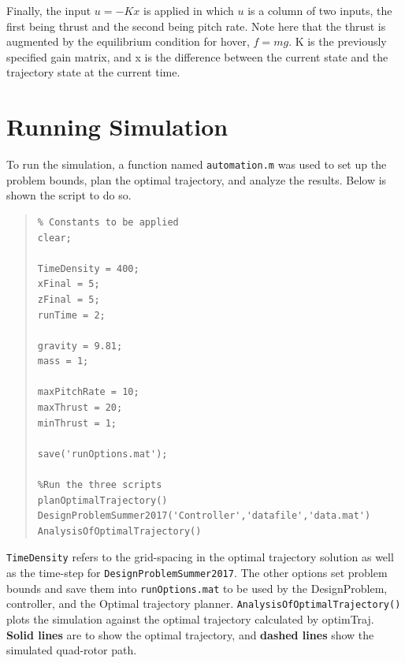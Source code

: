 \documentclass[12pt]{article}
\begin{document}
Finally, the input $u = -Kx$ is applied in which $u$ is a column of two inputs, the first being thrust and the second being pitch rate.  Note here that the thrust is augmented by the equilibrium condition for hover, $f = mg$.  K is the previously specified gain matrix, and x is the difference between the current state and the trajectory state at the current time.

\section{Running Simulation}\label{Running Simulation}

To run the simulation, a function named \lstinline!automation.m! was used to set up the problem bounds, plan the optimal trajectory, and analyze the results. Below is shown the script to do so.
\begin{quote}
\begin{lstlisting}
% Constants to be applied
clear; 

TimeDensity = 400;
xFinal = 5;
zFinal = 5;
runTime = 2;

gravity = 9.81;
mass = 1;

maxPitchRate = 10;
maxThrust = 20;
minThrust = 1;

save('runOptions.mat');

%Run the three scripts
planOptimalTrajectory()
DesignProblemSummer2017('Controller','datafile','data.mat')
AnalysisOfOptimalTrajectory()

\end{lstlisting}
\end{quote}
\lstinline!TimeDensity! refers to the grid-spacing in the optimal trajectory solution as well as the time-step for \lstinline!DesignProblemSummer2017!. The other options set problem bounds and save them into \lstinline!runOptions.mat! to be used by the DesignProblem, controller, and the Optimal trajectory planner. 
\newline
\newline
\lstinline!AnalysisOfOptimalTrajectory()! plots the simulation against the optimal trajectory calculated by optimTraj. \textbf{Solid lines} are to show the optimal trajectory, and \textbf{dashed lines} show the simulated quad-rotor path.
\end{document}
